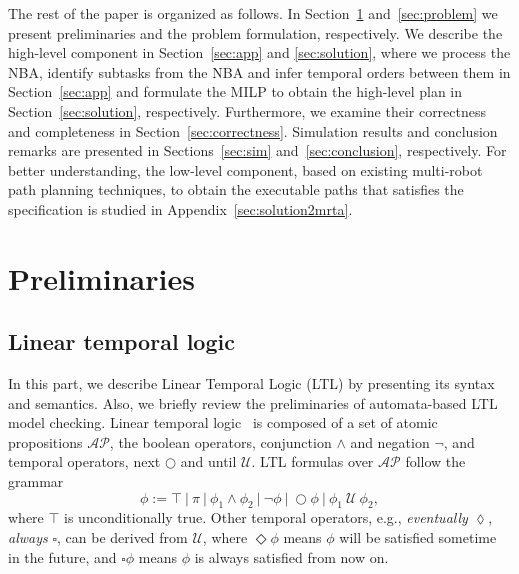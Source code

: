 \documentclass[Afour,sageh,times]{sagej}
\begin{document}
The rest of the paper is organized as follows. %
In Section~\ref{sec:preliminaries} and~\ref{sec:problem} we present preliminaries and the problem formulation, respectively. We describe the high-level component in  Section~\ref{sec:app} and \ref{sec:solution}, where we process the NBA, identify subtasks from the NBA and infer temporal orders between them in Section~\ref{sec:app} and formulate the MILP to obtain the high-level plan in Section~\ref{sec:solution}, respectively. Furthermore, we examine their correctness and completeness  in Section~\ref{sec:correctness}. Simulation results and conclusion remarks are presented in Sections~\ref{sec:sim} and~\ref{sec:conclusion}, respectively. For better understanding, the low-level component, based on existing multi-robot path planning techniques, to obtain the executable paths that satisfies the specification is studied in Appendix~\ref{sec:solution2mrta}.



\section{Preliminaries}\label{sec:preliminaries}
\subsection{Linear temporal logic}\label{sec:ltl}
In this part, we describe Linear Temporal Logic (LTL) by presenting its syntax and semantics. Also, we briefly review the preliminaries of automata-based LTL model checking.
Linear temporal logic~\citep{baier2008principles} is composed of a set of atomic propositions $\mathcal{AP}$, the boolean operators, conjunction $\wedge$ and negation $\neg$, and temporal operators, next $\bigcirc$ and until $\mathcal{U}$. LTL formulas over $\mathcal{AP}$ follow the grammar $$\phi:=\top~|~\pi~|~\phi_1\wedge\phi_2~|~\neg\phi~|~\bigcirc\phi~|~\phi_1~\mathcal{U}~\phi_2,$$ where $\top$ is unconditionally true.   Other temporal operators, e.g., \textit{eventually} $\lozenge$, \textit{always} $\square$, can be derived from $\mathcal{U}$, where $\Diamond \phi$ means $\phi$ will be satisfied sometime in the future, and $\square \phi$ means $\phi$ is always satisfied from now on. %
\end{document}
